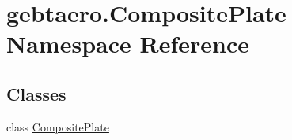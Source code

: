 \hypertarget{namespacegebtaero_1_1_composite_plate}{}\section{gebtaero.\+Composite\+Plate Namespace Reference}
\label{namespacegebtaero_1_1_composite_plate}
\subsection*{Classes}
\begin{DoxyCompactItemize}
\item 
class \hyperlink{classgebtaero_1_1_composite_plate_1_1_composite_plate}{Composite\+Plate}
\end{DoxyCompactItemize}
